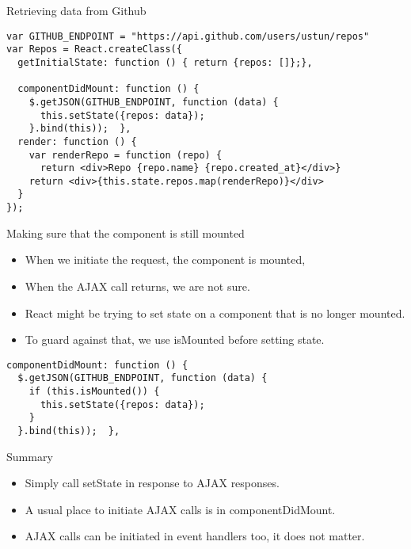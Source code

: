 \documentclass[presentation]{beamer}
\begin{document}
\begin{frame}[fragile,label=sec-5]{Retrieving data from Github}
 \begin{verbatim}
var GITHUB_ENDPOINT = "https://api.github.com/users/ustun/repos"
var Repos = React.createClass({
  getInitialState: function () { return {repos: []};},

  componentDidMount: function () {
    $.getJSON(GITHUB_ENDPOINT, function (data) {
      this.setState({repos: data});
    }.bind(this));  },
  render: function () {
    var renderRepo = function (repo) {
      return <div>Repo {repo.name} {repo.created_at}</div>}
    return <div>{this.state.repos.map(renderRepo)}</div>
  }
});
\end{verbatim}
\end{frame}

\begin{frame}[fragile,label=sec-6]{Making sure that the component is still mounted}
 \begin{itemize}
\item When we initiate the request, the component is mounted,
\item When the AJAX call returns, we are not sure.
\item React might be trying to set state on a component that is no longer
mounted.
\item To guard against that, we use isMounted before setting state.
\end{itemize}

\begin{verbatim}
componentDidMount: function () {
  $.getJSON(GITHUB_ENDPOINT, function (data) {
    if (this.isMounted()) {
      this.setState({repos: data});
    }
  }.bind(this));  },
\end{verbatim}
\end{frame}

\begin{frame}[label=sec-7]{Summary}
\begin{itemize}
\item Simply call setState in response to AJAX responses.
\item A usual place to initiate AJAX calls is in componentDidMount.
\item AJAX calls can be initiated in event handlers too, it does not matter.
\end{itemize}
\end{frame}
\end{document}
